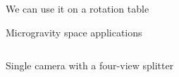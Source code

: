 \begin{frame}[label=app-22]{We can use it on a rotation table}
\end{frame}
    
    
    \begin{frame}[label=app-111]{Microgravity space applications}   
    \begin{columns}
    \end{columns}
    \end{frame}
    
    \begin{frame}[label=app-2]{Single camera with a four-view splitter}
    \centering{}
    \end{frame}
    
